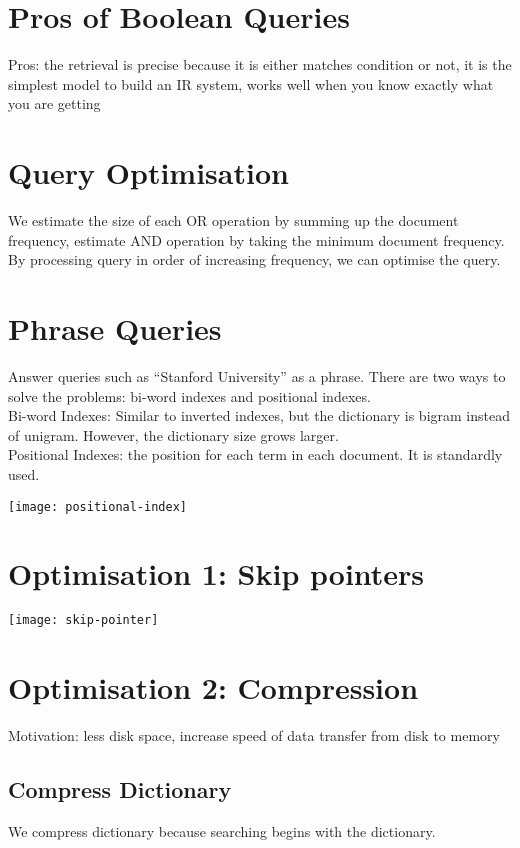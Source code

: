 \begin{multicols*}{2}
\section{Pros of Boolean Queries}
Pros: the retrieval is precise because it is either matches condition or not, it is the simplest model to build an IR system, works well when you know exactly what you are getting

\section{Query Optimisation}
We estimate the size of each OR operation by summing up the document frequency, estimate AND operation by taking the minimum document frequency. By processing query in order of increasing frequency, we can optimise the query. 

\section{Phrase Queries}
Answer queries such as ``Stanford University'' as a phrase. There are two ways to solve the problems: bi-word indexes and positional indexes. \\

\noindent Bi-word Indexes: Similar to inverted indexes, but the dictionary is bigram instead of unigram. However, the dictionary size grows larger. \\

\noindent Positional Indexes: the position for each term in each document. It is standardly used.
\begin{center}
\texttt{[image: positional-index]}
\end{center}

\section{Optimisation 1: Skip pointers}
\begin{center}
\texttt{[image: skip-pointer]}
\end{center}

\section{Optimisation 2: Compression}
Motivation: less disk space, increase speed of data transfer from disk to memory

\subsection{Compress Dictionary}
We compress dictionary because searching begins with the dictionary. \\


\end{multicols*}
